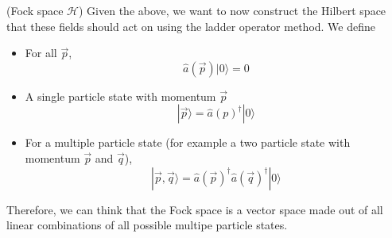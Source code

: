 \vspace{2ex}
\begin{prop}
(Fock space $\mathcal{H}$) Given the above, we want to now construct the Hilbert space that these fields should act on using the ladder operator method. We define
\begin{itemize}
\item[(i)] For all $\vec{p}$,
\[\hat{a}(\vec{p})|0\rangle =0\]
\item[(ii)] A single particle state with momentum $\vec{p}$
\[|\vec{p}\rangle =\hat{a}(p)^{\dagger}|0\rangle \]
\item[(iii)] For a multiple particle state (for example a two particle state with momentum $\vec{p}$ and $\vec{q}$),
\[|\vec{p},\vec{q}\rangle =\hat{a}(\vec{p})^{\dagger}\hat{a}(\vec{q})^{\dagger}|0\rangle \]
\end{itemize}
Therefore, we can think that the Fock space is a vector space made out of all linear combinations of all possible multipe particle states.
\end{prop}
\vspace{2ex}
